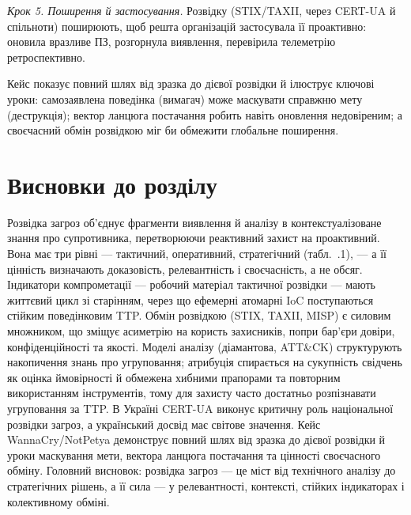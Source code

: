 \emph{Крок 5. Поширення й застосування.} Розвідку (STIX/TAXII, через CERT-UA й спільноти) поширюють, щоб решта організацій застосувала її проактивно: оновила вразливе ПЗ, розгорнула виявлення, перевірила телеметрію ретроспективно.

Кейс показує повний шлях від зразка до дієвої розвідки й ілюструє ключові уроки: самозаявлена поведінка (вимагач) може маскувати справжню мету (деструкція); вектор ланцюга постачання робить навіть оновлення недовіреним; а своєчасний обмін розвідкою міг би обмежити глобальне поширення.

\section*{Висновки до розділу}

Розвідка загроз об'єднує фрагменти виявлення й аналізу в контекстуалізоване знання про супротивника, перетворюючи реактивний захист на проактивний. Вона має три рівні --- тактичний, оперативний, стратегічний (табл.~\thechapter.1), --- а її цінність визначають доказовість, релевантність і своєчасність, а не обсяг. Індикатори компрометації --- робочий матеріал тактичної розвідки --- мають життєвий цикл зі старінням, через що ефемерні атомарні IoC поступаються стійким поведінковим TTP. Обмін розвідкою (STIX, TAXII, MISP) є силовим множником, що зміщує асиметрію на користь захисників, попри бар'єри довіри, конфіденційності та якості. Моделі аналізу (діамантова, ATT\&CK) структурують накопичення знань про угруповання; атрибуція спирається на сукупність свідчень як оцінка ймовірності й обмежена хибними прапорами та повторним використанням інструментів, тому для захисту часто достатньо розпізнавати угруповання за TTP. В Україні CERT-UA виконує критичну роль національної розвідки загроз, а український досвід має світове значення. Кейс WannaCry/NotPetya демонструє повний шлях від зразка до дієвої розвідки й уроки маскування мети, вектора ланцюга постачання та цінності своєчасного обміну. Головний висновок: розвідка загроз --- це міст від технічного аналізу до стратегічних рішень, а її сила --- у релевантності, контексті, стійких індикаторах і колективному обміні.

